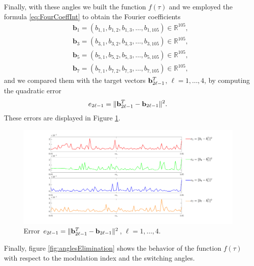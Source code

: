 \documentclass[a4paper]{article}
\numberwithin{equation}{section}
\begin{document}
Finally, with these angles we built the function $f(\tau)$ and we employed the formula \eqref{eq:FourCoeffInt} to obtain the Fourier coefficients 
\begin{align*}
	&{\bm{b}}_1 =(b_{1,1},b_{1,2},b_{1,3},\ldots,b_{1,105}) \in\mathbb{R}^{105},
	\\
	&{\bm{b}}_3 =(b_{3,1},b_{3,2},b_{3,3},\ldots,b_{3,105}) \in\mathbb{R}^{105},
	\\
	&{\bm{b}}_5 =(b_{5,1},b_{5,2},b_{5,3},\ldots,b_{5,105}) \in\mathbb{R}^{105},
	\\
	&{\bm{b}}_7 =(b_{7,1},b_{7,2},b_{7,3},\ldots,b_{7,105}) \in\mathbb{R}^{105},
\end{align*}
and we compared them with the target vectors ${\bf{b}}_{2\ell-1}^T$, $\ell=1,\ldots,4$, by computing the quadratic error
\begin{align*}
	e_{2\ell-1} = \|{\bf{b}}_{2\ell-1}^T-{\bf{b}}_{2\ell-1}\|^2.
\end{align*}
These errors are displayed in Figure \ref{fig:errorElimination}.

\begin{figure}[h]
	\centering
	\includegraphics[scale=0.37]{errorElimination}
	\caption{Error $e_{2\ell-1} = \|{\bf{b}}_{2\ell-1}^T-{\bf{b}}_{2\ell-1}\|^2$, $\ell = 1,\ldots,4$.}\label{fig:errorElimination}
\end{figure}

Finally, figure \ref{fig:anglesElimination} shows the behavior of the function $f(\tau)$ with respect to the modulation index and the switching angles. 
\end{document}
